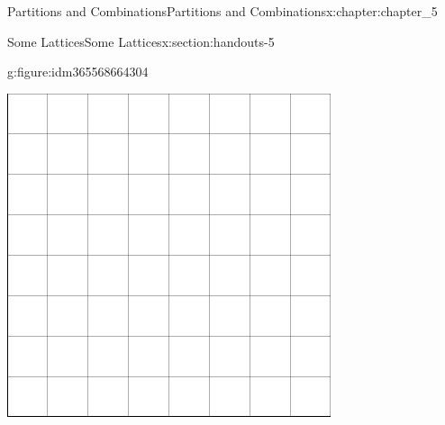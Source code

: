 \documentclass[oneside,10pt,]{book}
\numberwithin{equation}{section}
\begin{document}
\begin{chapterptx}{Partitions and Combinations}{}{Partitions and Combinations}{}{}{x:chapter:chapter_5}
\begin{sectionptx}{Some Lattices}{}{Some Lattices}{}{}{x:section:handouts-5}
\begin{figureptx}{}{g:figure:idm365568664304}{}
\begin{image}{0.125}{0.75}{0.125}
\includegraphics[width=\linewidth]{images/graphpaper8.png}
\end{image}%
\tcblower
\end{figureptx}%
\end{sectionptx}
\end{chapterptx}
%
%
\typeout{************************************************}
\typeout{************************************************}
%
\end{document}
